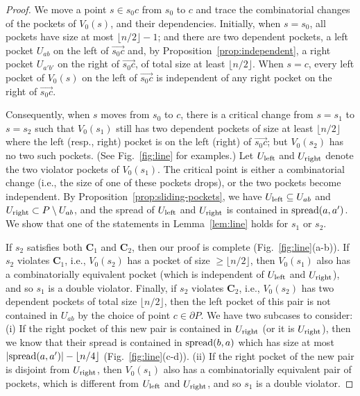 \documentclass[12pt]{article}
\newcommand{\spread}{{\rm spread}}
\newcommand{\floor}[1]{{\lfloor #1 \rfloor}}
\begin{document}
\begin{proof}
We move a point $s\in s_0c$ from $s_0$ to $c$ and trace the combinatorial changes
of the pockets of $V_0(s)$, and their dependencies. Initially, when $s=s_0$, all pockets
have size at most $\floor{n/2}-1$; and there are two dependent pockets, a left pocket $U_{ab}$ on the left of $\overrightarrow{s_0c}$ and, by Proposition~\ref{prop:independent}, a right pocket $U_{a'b'}$ on the right of $\overrightarrow{s_0c}$, of total size at least $\floor{n/2}$. When $s=c$, every left pocket of $V_0(s)$ on the left of $\overrightarrow{s_0c}$ is independent of any right pocket on the right of $\overrightarrow{s_0c}$.

Consequently, when $s$ moves from $s_0$ to $c$, there is a critical change from $s=s_1$ to $s=s_2$ such that $V_0(s_1)$ still has two dependent pockets of size at least $\floor{n/2}$ where the left (resp., right) pocket is on the left (right) of $\overrightarrow{s_0c}$; but $V_0(s_2)$ has no two such pockets. (See Fig.~\ref{fig:line} for examples.) Let $U_{\rm left}$ and $U_{\rm right}$ denote the two violator pockets of $V_0(s_1)$. The critical point is either a combinatorial change (i.e., the size of one of these pockets drops), or the two pockets become independent. By Proposition~\ref{prop:sliding-pockets}, we have $U_{\rm left}\subseteq U_{ab}$ and $U_{\rm right}\subset P\setminus U_{ab}$, and the spread of $U_{\rm left}$ and $U_{\rm right}$ is contained in $\spread(a,a')$. We show that one of the statements in Lemma~\ref{lem:line} holds for $s_1$ or $s_2$.

If $s_2$ satisfies both $\mathbf{C}_1$ and $\mathbf{C}_2$, then our proof is complete (Fig.~\ref{fig:line}(a-b)).
If $s_2$ violates $\mathbf{C}_1$, i.e., $V_0(s_2)$ has a pocket of size $\geq \floor{n/2}$,
then $V_0(s_1)$ also has a combinatorially equivalent pocket (which is independent of $U_{\rm left}$ and $U_{\rm right}$), and so $s_1$ is a double violator. Finally, if $s_2$ violates $\mathbf{C}_2$, i.e., $V_0(s_2)$ has two dependent pockets of total size $\floor{n/2}$, then the left pocket of this pair is not contained in $U_{ab}$ by the choice of point $c\in \partial P$. We have two subcases to consider: (i) If the right pocket of this new pair is contained in $U_{\rm right}$ (or it is $U_{\rm right}$), then we know that their spread is contained in $\spread(b,a)$ which has size at most $|\spread(a,a')|-\floor{n/4}$  (Fig.~\ref{fig:line}(c-d)). (ii) If the right pocket of the new pair is disjoint from $U_{\rm right}$, then $V_0(s_1)$ also has a combinatorially equivalent pair of pockets, which is different from $U_{\rm left}$ and $U_{\rm right}$, and so $s_1$ is a double violator.
\end{proof}
\end{document}
